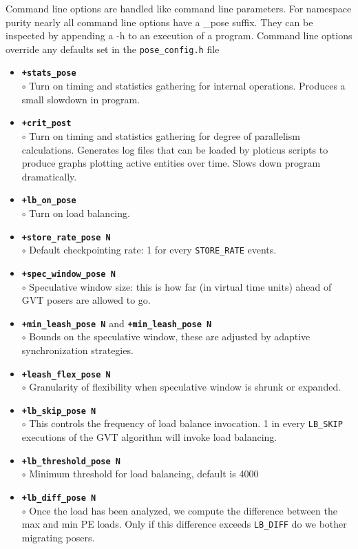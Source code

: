 Command line options are handled like \charmpp{} command line
parameters.  For namespace purity nearly all \pose{} command line options
have a \_pose suffix.  They can be inspected by appending a -h to an
execution of a \pose{} program.  Command line options override any
defaults set in the {\tt pose\_config.h} file

\begin{itemize}
\item {\tt {\bf +stats\_pose}}\\
	$\circ$ Turn on timing and statistics gathering for internal \pose{}
	operations.  Produces a small slowdown in program.\\
\item {\tt {\bf +crit\_post}}\\
	$\circ$ Turn on timing and statistics gathering for degree of parallelism calculations.  Generates log files that can be loaded by ploticus scripts to produce graphs plotting active entities over time.  Slows down program dramatically.\\
\item {\tt {\bf +lb\_on\_pose}}\\
	$\circ$ Turn on \pose{} load balancing.\\
\item {\tt {\bf +store\_rate\_pose N}}\\
	$\circ$ Default checkpointing rate: 1 for every {\tt STORE\_RATE} events.\\
\item {\tt {\bf +spec\_window\_pose N}}\\
	$\circ$ Speculative window size: this is how far (in virtual time units) ahead of GVT posers are allowed to go.\\
\item {\tt {\bf +min\_leash\_pose N}} and {\tt {\bf +min\_leash\_pose N}}\\
	$\circ$ Bounds on the speculative window, these are adjusted by adaptive synchronization strategies.\\
\item {\tt {\bf +leash\_flex\_pose N}}\\
	$\circ$ Granularity of flexibility when speculative window is shrunk or expanded.\\
\item {\tt {\bf +lb\_skip\_pose N}}\\
	$\circ$ This controls the frequency of load balance invocation.  1 in every {\tt LB\_SKIP} executions of the GVT algorithm will invoke load balancing.
\item {\tt {\bf +lb\_threshold\_pose N}}\\
	$\circ$ Minimum threshold for load balancing, default is 4000
\item {\tt {\bf +lb\_diff\_pose N}}\\
	$\circ$ Once the load has been analyzed, we compute the difference between the max and min PE loads.  Only if this difference exceeds {\tt LB\_DIFF} do we bother migrating posers.\\
\end{itemize}


